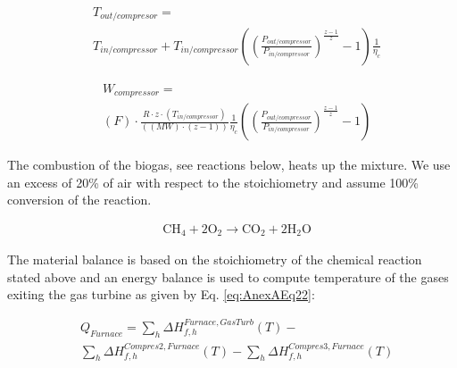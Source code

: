 \begin{refsection}[referencesCh2]
\begin{align}
	& {T_{out/compresor}} = \label{eq:AnexAEq20} \\
	& {T_{in/compressor}} + {T_{in/compressor}} \left( {{{\left( {\frac{{{P_{out/compressor}}}}{{{P_{in/compressor}}}}} \right)}^{\frac{{z - 1}}{z}}} - 1} \right)\frac{1}{{{\eta _c}}} \nonumber
\end{align}

\begin{align}
	& {W}_{ {compressor}} = \label{eq:AnexAEq21} \\
	& \left( F \right)\cdot\frac{{R\cdot z\cdot\left( {{{{T}}_{in/compressor}}} \right)}}{{\left( {\left( {{{MW}}} \right)\cdot\left( {z - {{1}}} \right)} \right)}}\frac{1}{{{\eta _c}}}\left( {{{\left( {\frac{{{P_{out/compressor}}}}{{{P_{in/compressor}}}}} \right)}^{\frac{{z - 1}}{z}}} - {{1}}} \right)  \nonumber
\end{align}

The combustion of the biogas, see reactions below, heats up the mixture. We use an excess of 20\% of air with respect to the stoichiometry and assume 100\% conversion of the reaction.  

\begin{align}
	& \text{CH}_4 + 2\text{O}_2 \rightarrow \text{CO}_2 + 2\text{H}_2 \text{O} \nonumber
\end{align}

The material balance is based on the stoichiometry of the chemical reaction stated above and an energy balance is used to compute temperature of the gases exiting the gas turbine as given by Eq. \ref{eq:AnexAEq22}:

\begin{align}
	& {Q_{Furnace}} = {\sum\limits_h {{{ {\Delta {H_{f,h}^{{Furnace,GasTurb}}}} (T) }}} } 	- \label{eq:AnexAEq22}\\
	& {\sum\limits_h {{{ {\Delta {H_{f,h}^{{Compres2,Furnace}}} (T)} }}} } -  {\sum\limits_h {{{ {\Delta {H_{f,h}^{{Compres3,Furnace}}}(T)} }}} } 	\nonumber
\end{align}



\end{refsection}
